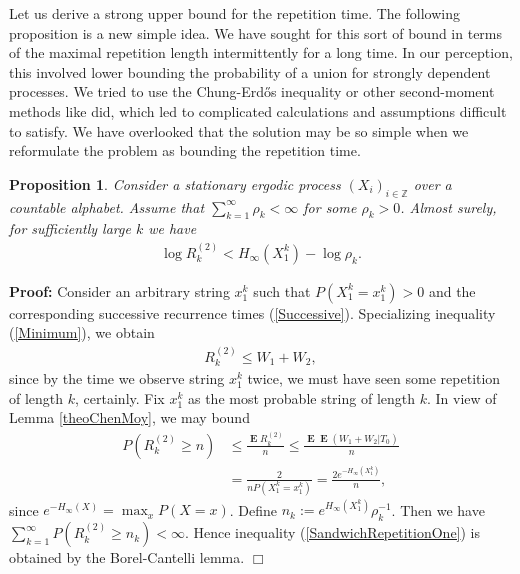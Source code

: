 \documentclass[a4paper]{article}
\newcommand{\okra}[1]{\left( #1 \right)}
\DeclareMathOperator{\mean}{\mathbf{E}}
\newtheorem{proposition}{Proposition}
\newenvironment*{proof}{\begin{trivlist}\item[]
\noindent\textbf{Proof:}}{$\Box$\par\end{trivlist}}
\begin{document}
Let us derive a strong upper bound for the repetition time.  The
following proposition is a new simple idea. We have sought for this
sort of bound in terms of the maximal repetition length intermittently
for a long time. In our perception, this involved lower bounding the
probability of a union for strongly dependent processes. We tried to
use the Chung-Erd\H{o}s inequality \citep{ChungErdos1952} or other
second-moment methods like \citet{Szpankowski93,Szpankowski93a} did,
which led to complicated calculations and assumptions difficult to
satisfy. We have overlooked that the solution may be so simple when we
reformulate the problem as bounding the repetition time.
\begin{proposition}
  \label{theoSandwichRepetitionOne}
  Consider a stationary ergodic process
  $(X_i)_{i\in\mathbb{Z}}$ over a countable alphabet. Assume that
  $\sum_{k=1}^\infty \rho_k<\infty$ for some $\rho_k>0$.  Almost
  surely, for sufficiently large $k$ we have
\begin{align}
  \label{SandwichRepetitionOne}
  \log R^{(2)}_k< H_\infty(X_1^k)-\log\rho_k
  .
\end{align}
\end{proposition}
\begin{proof}
  Consider an arbitrary string $x_1^k$ such that $P(X_1^k=x_1^k)>0$
  and the corresponding successive recurrence times
  (\ref{Successive}).  Specializing inequality (\ref{Minimum}), we
  obtain
  \begin{align}
    R^{(2)}_k\le W_1+W_2,
  \end{align}
  since by the time we observe string $x_1^k$ twice, we must have seen
  some repetition of length $k$, certainly.  Fix $x_1^k$ as the most
  probable string of length $k$.  In view of Lemma \ref{theoChenMoy},
  we may bound
  \begin{align}
    P(R^{(2)}_k\ge n)
    &\le \frac{\mean R^{(2)}_k}{n}
      \le \frac{\mean \mean\okra{W_1+W_2|T_0}}{n}
      \nonumber\\
    &= \frac{2}{nP(X_1^k=x_1^k)}
      = \frac{2e^{-H_\infty(X_1^k)}}{n},
  \end{align}
  since $e^{-H_\infty(X)}=\max_{x} P(X=x)$.  Define
  $n_k:=e^{H_\infty(X_1^k)}\rho_k^{-1}$. Then we have
  $\sum_{k=1}^\infty P(R^{(2)}_k\ge n_k)<\infty$. Hence inequality
  (\ref{SandwichRepetitionOne}) is obtained by the Borel-Cantelli
  lemma.
\end{proof}
\end{document}
